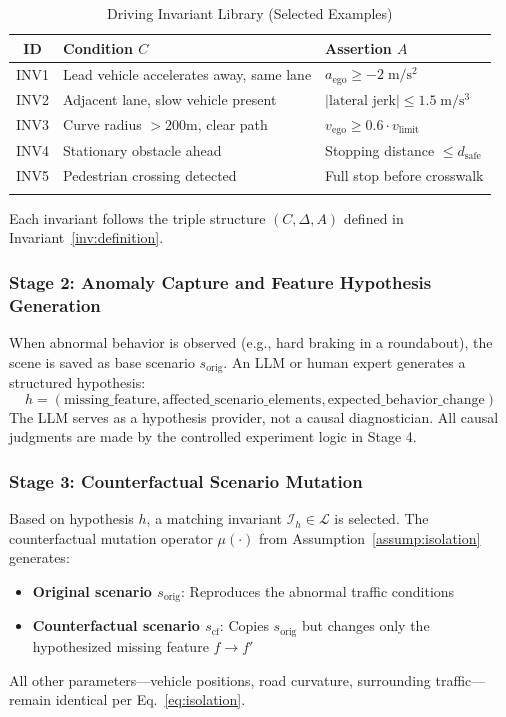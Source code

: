 \documentclass[conference]{IEEEtran}
\theoremstyle{plain}
\begin{document}
\begin{table}[h]
\centering
\caption{Driving Invariant Library (Selected Examples)}
\label{tab:invariants}
\begin{tabular}{cp{2.8cm}p{3.2cm}}
\toprule
\textbf{ID} & \textbf{Condition $C$} & \textbf{Assertion $A$} \\
\midrule
INV1 & Lead vehicle accelerates away, same lane & $a_{\text{ego}} \geq -2\;\si{\meter\per\square\second}$ \\
INV2 & Adjacent lane, slow vehicle present & $|\text{lateral jerk}| \leq 1.5\;\si{\meter\per\cubic\second}$ \\
INV3 & Curve radius $> 200$m, clear path & $v_{\text{ego}} \geq 0.6 \cdot v_{\text{limit}}$ \\
INV4 & Stationary obstacle ahead & Stopping distance $\leq d_{\text{safe}}$ \\
INV5 & Pedestrian crossing detected & Full stop before crosswalk \\
\midrule
\addlinespace
\end{tabular}
\begin{tablenotes}\footnotesize
\item Each invariant follows the triple structure $(C, \Delta, A)$ defined in Invariant\ \ref{inv:definition}.
\end{tablenotes}
\end{table}

\subsubsection{Stage 2: Anomaly Capture and Feature Hypothesis Generation}
When abnormal behavior is observed (e.g., hard braking in a roundabout), the scene is saved as base scenario $s_{\text{orig}}$. An LLM or human expert generates a structured hypothesis:
\begin{equation}
h = (\text{missing\_feature}, \text{affected\_scenario\_elements}, \text{expected\_behavior\_change})
\label{eq:hypothesis}
\end{equation}
The LLM serves as a hypothesis provider, not a causal diagnostician. All causal judgments are made by the controlled experiment logic in Stage 4.

\subsubsection{Stage 3: Counterfactual Scenario Mutation}
Based on hypothesis $h$, a matching invariant $\mathcal{I}_h \in \mathcal{L}$ is selected. The counterfactual mutation operator $\mu(\cdot)$ from Assumption\ \ref{assump:isolation} generates:
\begin{itemize}
    \item \textbf{Original scenario $s_{\text{orig}}$}: Reproduces the abnormal traffic conditions
    \item \textbf{Counterfactual scenario $s_{\text{cf}}$}: Copies $s_{\text{orig}}$ but changes only the hypothesized missing feature $f \rightarrow f'$
\end{itemize}
All other parameters---vehicle positions, road curvature, surrounding traffic---remain identical per Eq.\ \eqref{eq:isolation}.
\end{document}
